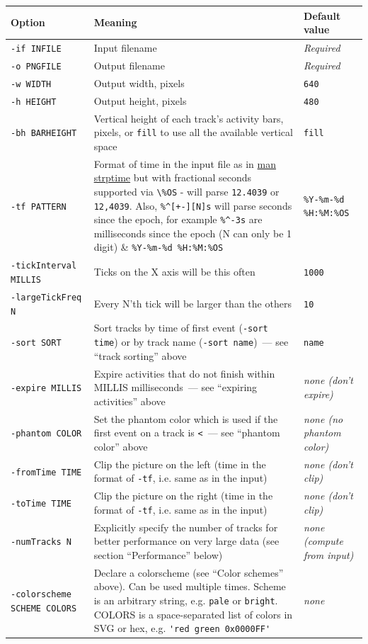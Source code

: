\documentclass{article}
\begin{document}
\begin{longtable}{|l|p{160px}|l|}
\hline
Option & Meaning & Default value \\
\hline
\endhead
\verb|-if INFILE| & Input filename & \emph{Required} \\
\hline
\verb|-o PNGFILE| & Output filename & \emph{Required} \\
\hline
\verb|-w WIDTH|   & Output width, pixels & \verb|640| \\
\hline
\verb|-h HEIGHT|  & Output height, pixels & \verb|480| \\
\hline
\verb|-bh BARHEIGHT| & Vertical height of each track's activity bars, pixels, or \verb|fill| to use all the available vertical space & \verb|fill| \\
\hline
\verb|-tf PATTERN| & Format of time in the input file as in \href{http://linux.die.net/man/3/strptime}{man strptime} but with fractional seconds supported via \verb|\%OS| - will parse \verb|12.4039| or \verb|12,4039|.  Also, \verb|%^[+-][N]s| will parse seconds since the epoch, for example \verb|%^-3s| are milliseconds since the epoch (N can only be 1 digit) & \verb|%Y-%m-%d %H:%M:%OS| \\
\hline
\verb|-tickInterval MILLIS| & Ticks on the X axis will be this often & \verb|1000| \\
\hline
\verb|-largeTickFreq N| & Every N'th tick will be larger than the others & \verb|10| \\
\hline
\verb|-sort SORT| & Sort tracks by time of first event (\verb|-sort time|) or by track name (\verb|-sort name|)~--- see ``track sorting'' above & \verb|name| \\
\hline
\verb|-expire MILLIS| & Expire activities that do not finish within MILLIS milliseconds~--- see ``expiring activities'' above & \emph{none (don't expire)} \\
\hline
\verb|-phantom COLOR| & Set the phantom color which is used if the first event on a track is \texttt{<}~--- see ``phantom color'' above & \emph{none (no phantom color)} \\
\hline
\verb|-fromTime TIME| & Clip the picture on the left (time in the format of \verb|-tf|, i.e. same as in the input) & \emph{none (don't clip)} \\
\hline
\verb|-toTime TIME| & Clip the picture on the right (time in the format of \verb|-tf|, i.e. same as in the input) & \emph{none (don't clip)} \\
\hline
\verb|-numTracks N| & Explicitly specify the number of tracks for better performance on very large data (see section ``Performance'' below) & \emph{none (compute from input)} \\
\hline
\verb|-colorscheme SCHEME COLORS| & Declare a colorscheme (see ``Color schemes'' above). Can be used multiple times. Scheme is an arbitrary string, e.g. \verb|pale| or \verb|bright|. COLORS is a space-separated list of colors in SVG or hex, e.g. \verb|'red green 0x0000FF'| & \emph{none} \\
\hline
\end{longtable}
\end{document}
